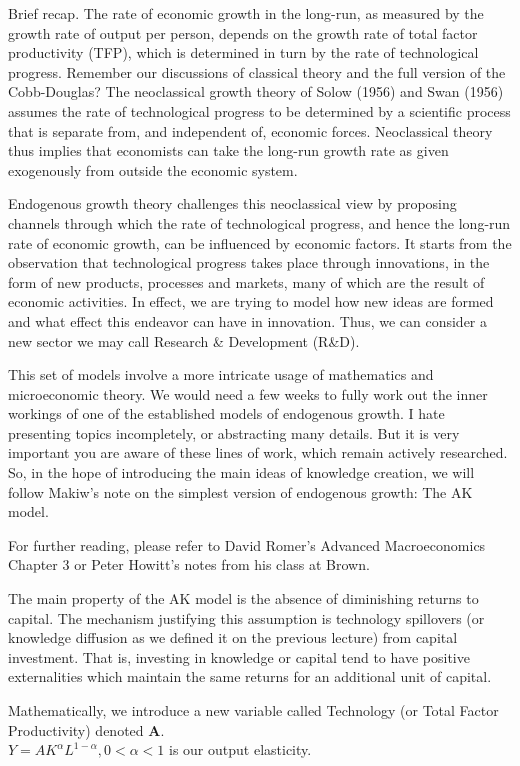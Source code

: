 \documentclass[10pt]{article}
\begin{document}
Brief recap. The rate of economic growth in the long-run, as measured by the growth rate of output per person, depends on the growth rate of total factor productivity (TFP), which is determined in turn by the rate of technological progress. Remember our discussions of classical theory and the full version of the Cobb-Douglas? The neoclassical growth theory of Solow (1956) and Swan (1956) assumes the rate of technological progress to be determined by a scientific process that is separate from, and independent of, economic forces. Neoclassical theory thus implies that economists can take the long-run growth rate as given exogenously from outside the economic system.

Endogenous growth theory challenges this neoclassical view by proposing channels through which the rate of technological progress, and hence the long-run rate of economic growth, can be influenced by economic factors. It starts from the observation that technological progress takes place through innovations, in the form of new products, processes and markets, many of which are the result of economic activities. In effect, we are trying to model how new ideas are formed and what effect this endeavor can have in innovation. Thus, we can consider a new sector we may call Research \& Development (R\&D).

This set of models involve a more intricate usage of mathematics and microeconomic theory. We would need a few weeks to fully work out the inner workings of one of the established models of endogenous growth. I hate presenting topics incompletely, or abstracting many details. But it is very important you are aware of these lines of work, which remain actively researched. So, in the hope of introducing the main ideas of knowledge creation, we will follow Makiw's note on the simplest version of endogenous growth: The AK model.

For further reading, please refer to David Romer's Advanced Macroeconomics Chapter 3 or Peter Howitt's notes from his class at Brown.

The main property of the AK model is the absence of diminishing returns to capital. The mechanism justifying this assumption is technology spillovers (or knowledge diffusion as we defined it on the previous lecture) from capital investment. That is, investing in knowledge or capital tend to have positive externalities which maintain the same returns for an additional unit of capital.

Mathematically, we introduce a new variable called Technology (or Total Factor Productivity) denoted $\mathbf{A}$.\\
$Y=A K^{\alpha} L^{1-\alpha}, 0<\alpha<1$ is our output elasticity.
\end{document}

